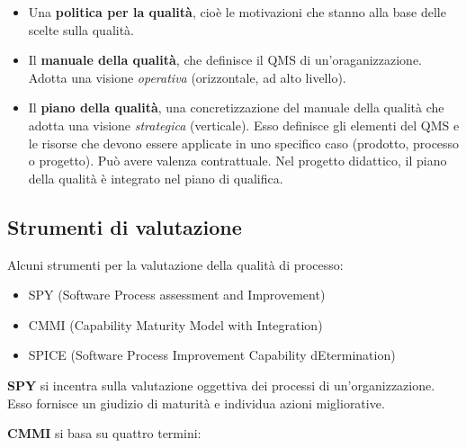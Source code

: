 \documentclass[a4paper]{article}
\begin{document}
	\begin{itemize}
		
			
	\item Una \textbf{politica per la qualità}, cioè le motivazioni che stanno alla base delle scelte sulla qualità.
			
	\item Il \textbf{manuale della qualità}, che definisce il QMS di un'oraganizzazione. Adotta una visione \emph{operativa} (orizzontale, ad alto livello).
			
	\item Il \textbf{piano della qualità}, una concretizzazione del manuale della qualità che adotta una visione \emph{strategica} (verticale). Esso definisce gli elementi del QMS e le risorse che devono essere applicate in uno specifico caso (prodotto, processo o progetto). Può avere valenza contrattuale. Nel progetto didattico, il piano della qualità è integrato nel piano di qualifica.
		
	\end{itemize}


		
	\subsection{Strumenti di valutazione}

		
Alcuni strumenti per la valutazione della qualità di processo:
		
	\begin{itemize}
		
			
	\item SPY (Software Process assessment and Improvement)
			
	\item CMMI (Capability Maturity Model with Integration)
			
	\item SPICE (Software Process Improvement Capability dEtermination)
		
	\end{itemize}

		
\textbf{SPY} si incentra sulla valutazione oggettiva dei processi di un'organizzazione. Esso fornisce un giudizio di maturità e individua azioni migliorative.
		
\textbf{CMMI} si basa su quattro termini:
		
\end{document}

